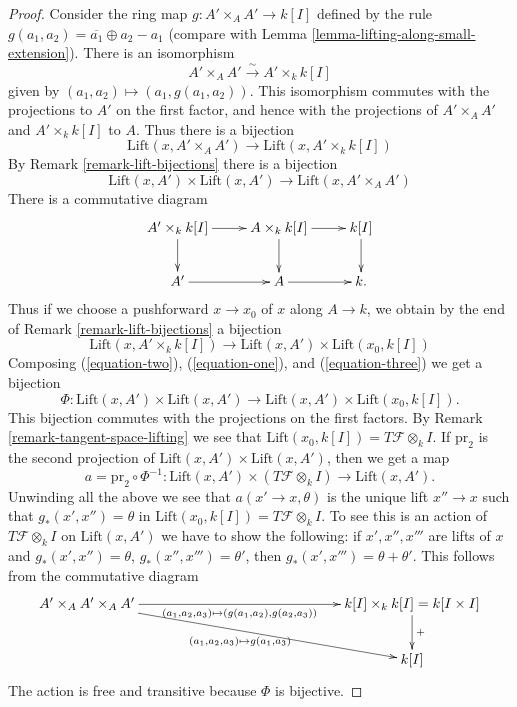 \begin{proof}
Consider the ring map $g : A' \times_A A' \to k[I]$ defined by the
rule $g(a_1, a_2) = \overline{a_1} \oplus a_2 - a_1$ (compare with
Lemma \ref{lemma-lifting-along-small-extension}).
There is an isomorphism
$$
A' \times_{A} A' \xrightarrow{\sim} A' \times_k k[I]
$$
given by $(a_1, a_2) \mapsto (a_1, g(a_1, a_2))$.
This isomorphism commutes with the projections to $A'$ on the first
factor, and hence with the projections of
$A' \times_A A'$ and $A' \times_k k[I]$ to $A$. Thus there is a bijection
\begin{equation}
\label{equation-one}
\text{Lift}(x, A' \times_A A')
\longrightarrow
\text{Lift}(x, A' \times_k k[I])
\end{equation}
By Remark \ref{remark-lift-bijections} there is a bijection
\begin{equation}
\label{equation-two}
\text{Lift}(x, A') \times \text{Lift}(x, A')
\longrightarrow
\text{Lift}(x, A' \times_{A} A')
\end{equation}
There is a commutative diagram
$$
\xymatrix{
A' \times_k k[I] \ar[r] \ar[d] & A \times_k k[I] \ar[r] \ar[d] & k[I] \ar[d] \\
A' \ar[r] & A \ar[r] & k.
}
$$
Thus if we choose a pushforward $x \to x_0$ of $x$ along
$A \to k$, we obtain by the end of
Remark \ref{remark-lift-bijections}
a bijection
\begin{equation}
\label{equation-three}
\text{Lift}(x, A' \times_k k[I])
\longrightarrow
\text{Lift}(x, A') \times \text{Lift}(x_0, k[I])
\end{equation}
Composing (\ref{equation-two}), (\ref{equation-one}), and
(\ref{equation-three})
we get a bijection
$$
\Phi :
\text{Lift}(x, A') \times \text{Lift}(x, A') 
\longrightarrow
\text{Lift}(x, A') \times \text{Lift}(x_0, k[I]).
$$
This bijection commutes with the projections on the first factors.
By Remark \ref{remark-tangent-space-lifting}
we see that $\text{Lift}(x_0, k[I]) = T\mathcal{F} \otimes_k I$.
If $\text{pr}_2$ is the second projection of
$\text{Lift}(x,A') \times \text{Lift}(x,A')$, then we get a map
$$
a = \text{pr}_2 \circ \Phi^{-1} :
\text{Lift}(x, A') \times (T\mathcal{F} \otimes_k I)
\longrightarrow
\text{Lift}(x,A').
$$
Unwinding all the above we see that $a(x' \to x, \theta)$
is the unique lift $x'' \to x$ such that $g_*(x', x'') = \theta$
in $\text{Lift}(x_0, k[I]) = T\mathcal{F} \otimes_k I$.
To see this is an action of $T\mathcal{F} \otimes_k I$ on $\text{Lift}(x, A')$
we have to show the following: if $x', x'', x'''$ are lifts of $x$ and
$g_*(x', x'') = \theta$, $g_*(x'', x''') = \theta'$, then
$g_*(x', x''') = \theta + \theta'$. This follows from the commutative
diagram
$$
\xymatrix{
A' \times_A A' \times_A A'
\ar[rrrrr]_-{(a_1, a_2, a_3) \mapsto (g(a_1, a_2), g(a_2, a_3))}
\ar[rrrrrd]_{(a_1, a_2, a_3) \mapsto g(a_1, a_3)} & & & & &
k[I] \times_k k[I] = k[I \times I] \ar[d]^{+} \\
& & & & & k[I]
}
$$
The action is free and transitive because $\Phi$ is bijective.
\end{proof} 

